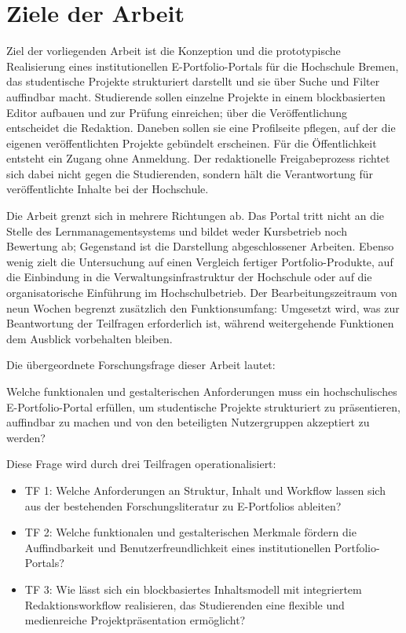 \section{Ziele der Arbeit}
\label{sec:ziele}

Ziel der vorliegenden Arbeit ist die Konzeption und die prototypische Realisierung eines institutionellen E-Portfolio-Portals für die Hochschule Bremen, das studentische Projekte strukturiert darstellt und sie über Suche und Filter auffindbar macht. Studierende sollen einzelne Projekte in einem blockbasierten Editor aufbauen und zur Prüfung einreichen; über die Veröffentlichung entscheidet die Redaktion. Daneben sollen sie eine Profilseite pflegen, auf der die eigenen veröffentlichten Projekte gebündelt erscheinen. Für die Öffentlichkeit entsteht ein Zugang ohne Anmeldung. Der redaktionelle Freigabeprozess richtet sich dabei nicht gegen die Studierenden, sondern hält die Verantwortung für veröffentlichte Inhalte bei der Hochschule.

Die Arbeit grenzt sich in mehrere Richtungen ab. Das Portal tritt nicht an die Stelle des Lernmanagementsystems und bildet weder Kursbetrieb noch Bewertung ab; Gegenstand ist die Darstellung abgeschlossener Arbeiten. Ebenso wenig zielt die Untersuchung auf einen Vergleich fertiger Portfolio-Produkte, auf die Einbindung in die Verwaltungsinfrastruktur der Hochschule oder auf die organisatorische Einführung im Hochschulbetrieb. Der Bearbeitungszeitraum von neun Wochen begrenzt zusätzlich den Funktionsumfang: Umgesetzt wird, was zur Beantwortung der Teilfragen erforderlich ist, während weitergehende Funktionen dem Ausblick vorbehalten bleiben.

Die übergeordnete Forschungsfrage dieser Arbeit lautet:

Welche funktionalen und gestalterischen Anforderungen muss ein hochschulisches E-Portfolio-Portal erfüllen, um studentische Projekte strukturiert zu präsentieren, auffindbar zu machen und von den beteiligten Nutzergruppen akzeptiert zu werden?

Diese Frage wird durch drei Teilfragen operationalisiert:

\begin{itemize}[topsep=0.4em, itemsep=0.4em]
	\item TF 1: Welche Anforderungen an Struktur, Inhalt und Workflow lassen sich aus der bestehenden Forschungsliteratur zu E-Portfolios ableiten?
	\item TF 2: Welche funktionalen und gestalterischen Merkmale fördern die Auffindbarkeit und Benutzerfreundlichkeit eines institutionellen Portfolio-Portals?
	\item TF 3: Wie lässt sich ein blockbasiertes Inhaltsmodell mit integriertem Redaktionsworkflow realisieren, das Studierenden eine flexible und medienreiche Projektpräsentation ermöglicht?
\end{itemize}

